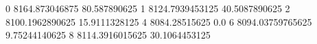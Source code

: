 0 8164.873046875 80.587890625
1 8124.7939453125 40.5087890625
2 8100.1962890625 15.9111328125
4 8084.28515625 0.0
6 8094.03759765625 9.75244140625
8 8114.3916015625 30.1064453125
